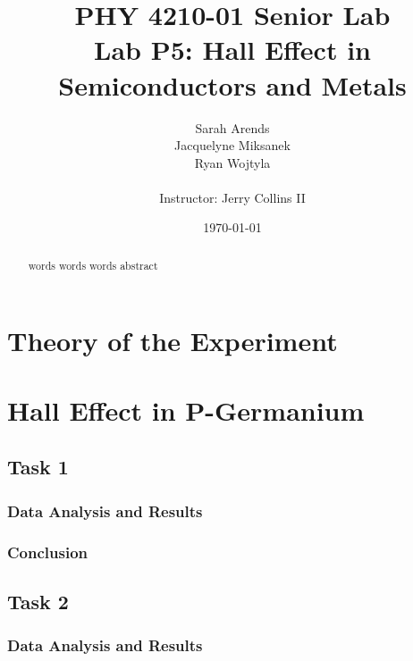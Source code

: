\documentclass[a4paper]{article}
\title{PHY 4210-01 Senior Lab \\Lab P5: Hall Effect in Semiconductors and Metals}
\author{Sarah Arends \\ 
        Jacquelyne Miksanek \\
        Ryan Wojtyla \\ \\
        Instructor: Jerry Collins II}
\date{\today}
\begin{document}
\maketitle 

\begin{abstract}
\qq words words words abstract
\end{abstract}

\newpage

\setcounter{tocdepth}{2}
\tableofcontents

\newpage

\section{Theory of the Experiment}

\section{Hall Effect in P-Germanium}

\subsection{Task 1}

\subsubsection{Data Analysis and Results}

\subsubsection{Conclusion}

\subsection{Task 2}

\subsubsection{Data Analysis and Results}
\end{document}
